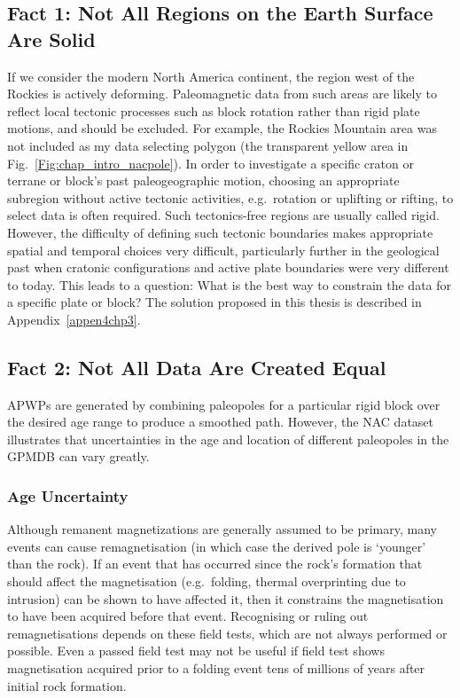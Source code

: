 \subsection{Fact 1: Not All Regions on the Earth Surface Are
Solid}\label{sec:f1}

If we consider the modern North America continent, the region west of the
Rockies is actively deforming. Paleomagnetic data from such areas are likely to
reflect local tectonic processes such as block rotation rather than rigid plate
motions, and should be excluded. For example, the Rockies Mountain area was not
included as my data selecting polygon (the transparent yellow area in
Fig.~\ref{Fig:chap_intro_nacpole}). In order to investigate a specific craton or
terrane or block's past paleogeographic motion, choosing an appropriate
subregion without active tectonic activities, e.g.\ rotation or uplifting or
rifting, to select data is often required. Such tectonics-free regions are
usually called rigid. However, the difficulty of defining such tectonic
boundaries makes appropriate spatial and temporal choices very difficult,
particularly further in the geological past when cratonic configurations and
active plate boundaries were very different to today. This leads to a question:
What is the best way to constrain the data for a specific plate or block? The
solution proposed in this thesis is described in Appendix~\ref{appen4chp3}.

\subsection{Fact 2: Not All Data Are Created Equal}\label{sec:f2}

APWPs are generated by combining paleopoles for a particular rigid block over
the desired age range to produce a smoothed path. However, the NAC dataset
illustrates that uncertainties in the age and location of different paleopoles
in the GPMDB can vary greatly.

\subsubsection{Age Uncertainty}\label{sec:ageu}

Although remanent magnetizations are generally assumed to be primary, many
events can cause remagnetisation (in which case the derived pole is `younger'
than the rock). If an event that has occurred since the rock's formation that
should affect the magnetisation (e.g.\ folding, thermal overprinting due to
intrusion) can be shown to have affected it, then it constrains the
magnetisation to have been acquired before that event. Recognising or ruling
out remagnetisations depends on these field tests, which are not always
performed or possible. Even a passed field test may not be useful if field test
shows magnetisation acquired prior to a folding event tens of millions of years
after initial rock formation.

